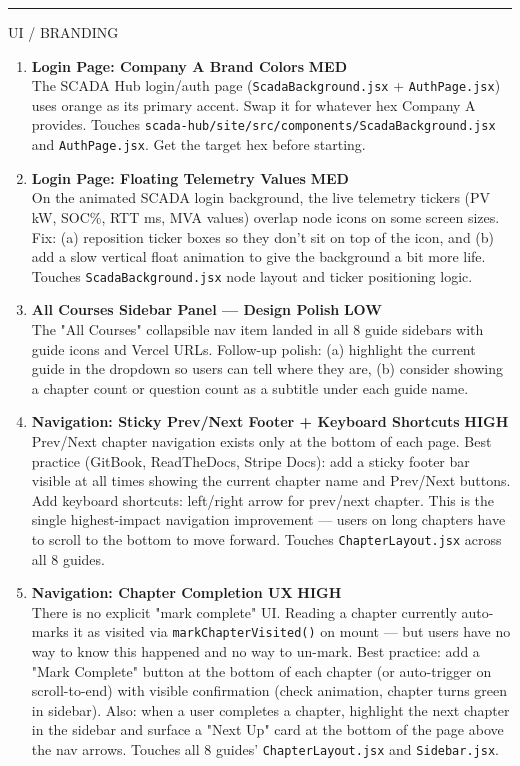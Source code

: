 \documentclass[10pt]{article}
\newcommand{\high}{\textcolor{sred}{\small\bfseries HIGH}}
\newcommand{\med}{\textcolor{samber}{\small\bfseries MED}}
\newcommand{\low}{\textcolor{sgreen}{\small\bfseries LOW}}
\begin{document}
\smallskip
{\color{snavy}\rule{\linewidth}{0.4pt}}
\smallskip

{\small\sffamily\color{sgray}\MakeUppercase{UI / Branding}}
\smallskip

\begin{enumerate}[resume]\small
  \item \textbf{Login Page: Company A Brand Colors} \hfill \med \\
    The SCADA Hub login/auth page (\texttt{ScadaBackground.jsx} + \texttt{AuthPage.jsx}) uses orange as its primary accent. Swap it for whatever hex Company A provides. Touches \texttt{scada-hub/site/src/components/ScadaBackground.jsx} and \texttt{AuthPage.jsx}. Get the target hex before starting.

  \item \textbf{Login Page: Floating Telemetry Values} \hfill \med \\
    On the animated SCADA login background, the live telemetry tickers (PV kW, SOC\%, RTT ms, MVA values) overlap node icons on some screen sizes. Fix: (a) reposition ticker boxes so they don't sit on top of the icon, and (b) add a slow vertical float animation to give the background a bit more life. Touches \texttt{ScadaBackground.jsx} node layout and ticker positioning logic.

  \item \textbf{All Courses Sidebar Panel — Design Polish} \hfill \low \\
    The "All Courses" collapsible nav item landed in all 8 guide sidebars with guide icons and Vercel URLs. Follow-up polish: (a) highlight the current guide in the dropdown so users can tell where they are, (b) consider showing a chapter count or question count as a subtitle under each guide name.

  \item \textbf{Navigation: Sticky Prev/Next Footer + Keyboard Shortcuts} \hfill \high \\
    Prev/Next chapter navigation exists only at the bottom of each page. Best practice (GitBook, ReadTheDocs, Stripe Docs): add a sticky footer bar visible at all times showing the current chapter name and Prev/Next buttons. Add keyboard shortcuts: left/right arrow for prev/next chapter. This is the single highest-impact navigation improvement — users on long chapters have to scroll to the bottom to move forward. Touches \texttt{ChapterLayout.jsx} across all 8 guides.

  \item \textbf{Navigation: Chapter Completion UX} \hfill \high \\
    There is no explicit "mark complete" UI. Reading a chapter currently auto-marks it as visited via \texttt{markChapterVisited()} on mount — but users have no way to know this happened and no way to un-mark. Best practice: add a "Mark Complete" button at the bottom of each chapter (or auto-trigger on scroll-to-end) with visible confirmation (check animation, chapter turns green in sidebar). Also: when a user completes a chapter, highlight the next chapter in the sidebar and surface a "Next Up" card at the bottom of the page above the nav arrows. Touches all 8 guides' \texttt{ChapterLayout.jsx} and \texttt{Sidebar.jsx}.


\end{enumerate}
\end{document}
